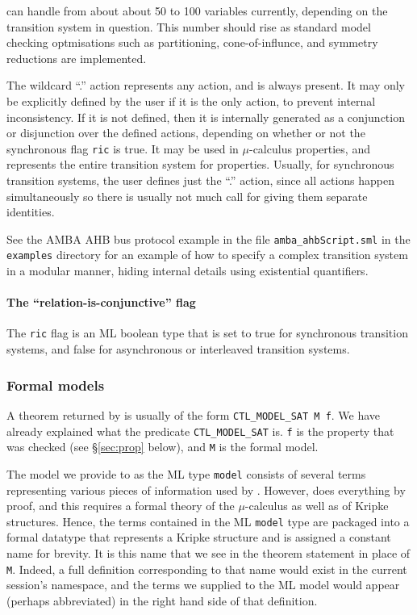 \hc{} can handle from about about 50 to 100 variables currently, depending on the transition system in question. This number should rise as standard model checking optmisations such as partitioning, cone-of-influnce, and symmetry reductions are implemented.

The wildcard ``.'' action represents any action, and is always present. It may only be explicitly defined by the user if it is the only action, to prevent internal inconsistency. If it is not defined, then it is internally generated as a conjunction or disjunction over the defined actions, depending on whether or not the synchronous flag \texttt{ric} is true. It may be used in \(\mu\)-calculus properties, and represents the entire transition system for \ctl properties. Usually, for synchronous transition systems, the user defines just the ``.'' action, since all actions happen simultaneously so there is usually not much call for giving them separate identities.

See the AMBA AHB bus protocol example in the file \texttt{amba\_ahbScript.sml} in the \hc{} \texttt{examples} directory for an example of how to specify a complex transition system in a modular manner, hiding internal details using existential quantifiers.

\paragraph{The ``relation-is-conjunctive'' flag} The \texttt{ric} flag is an ML boolean type that is set to true for synchronous transition systems, and false for asynchronous or interleaved transition systems.

\subsubsection{Formal models}\label{sec:formal_models}

A theorem returned by \hc{} is usually of the form \texttt{CTL\_MODEL\_SAT M f}. We have already explained what the predicate \texttt{CTL\_MODEL\_SAT} is. \texttt{f} is the property that was checked (see \S\ref{sec:prop} below), and \texttt{M} is the formal model.

The model we provide to \hc{} as the ML type \texttt{model} consists of several \HOL{} terms representing various pieces of information used by \hc{}. However, \hc{} does everything by proof, and this requires a formal \HOL{} theory of the \( \mu\)-calculus as well as of Kripke structures. Hence, the terms contained in the ML \texttt{model} type are packaged into a formal \HOL{} datatype that represents a Kripke structure and is assigned a constant name for brevity. It is this name that we see in the theorem statement in place of \texttt{M}. Indeed, a full \HOL{} definition corresponding to that name would exist in the current session's namespace, and the \HOL{} terms we supplied to the ML model would appear (perhaps abbreviated) in the right hand side of that definition.

